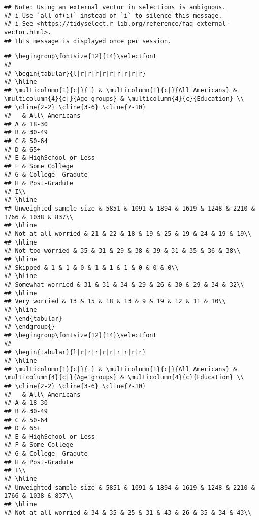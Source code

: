 \documentclass[
]{article}
\begin{document}
\begin{verbatim}
## Note: Using an external vector in selections is ambiguous.
## i Use `all_of(i)` instead of `i` to silence this message.
## i See <https://tidyselect.r-lib.org/reference/faq-external-vector.html>.
## This message is displayed once per session.
\end{verbatim}

\begin{verbatim}
## \begingroup\fontsize{12}{14}\selectfont
## 
## \begin{tabular}{l|r|r|r|r|r|r|r|r|r}
## \hline
## \multicolumn{1}{c|}{ } & \multicolumn{1}{c|}{All Americans} & \multicolumn{4}{c|}{Age groups} & \multicolumn{4}{c}{Education} \\
## \cline{2-2} \cline{3-6} \cline{7-10}
##   & All\_Americans
## A & 18-30
## B & 30-49
## C & 50-64
## D & 65+
## E & HighSchool or Less
## F & Some College
## G & College  Gradute
## H & Post-Gradute
## I\\
## \hline
## Unweighted sample size & 5851 & 1091 & 1894 & 1619 & 1248 & 2210 & 1766 & 1038 & 837\\
## \hline
## Not at all worried & 21 & 22 & 18 & 19 & 25 & 19 & 24 & 19 & 19\\
## \hline
## Not too worried & 35 & 31 & 29 & 38 & 39 & 31 & 35 & 36 & 38\\
## \hline
## Skipped & 1 & 1 & 0 & 1 & 1 & 1 & 0 & 0 & 0\\
## \hline
## Somewhat worried & 31 & 31 & 34 & 29 & 26 & 30 & 29 & 34 & 32\\
## \hline
## Very worried & 13 & 15 & 18 & 13 & 9 & 19 & 12 & 11 & 10\\
## \hline
## \end{tabular}
## \endgroup{}
## \begingroup\fontsize{12}{14}\selectfont
## 
## \begin{tabular}{l|r|r|r|r|r|r|r|r|r}
## \hline
## \multicolumn{1}{c|}{ } & \multicolumn{1}{c|}{All Americans} & \multicolumn{4}{c|}{Age groups} & \multicolumn{4}{c}{Education} \\
## \cline{2-2} \cline{3-6} \cline{7-10}
##   & All\_Americans
## A & 18-30
## B & 30-49
## C & 50-64
## D & 65+
## E & HighSchool or Less
## F & Some College
## G & College  Gradute
## H & Post-Gradute
## I\\
## \hline
## Unweighted sample size & 5851 & 1091 & 1894 & 1619 & 1248 & 2210 & 1766 & 1038 & 837\\
## \hline
## Not at all worried & 34 & 35 & 25 & 31 & 43 & 26 & 35 & 34 & 43\\

\end{verbatim}
\end{document}
